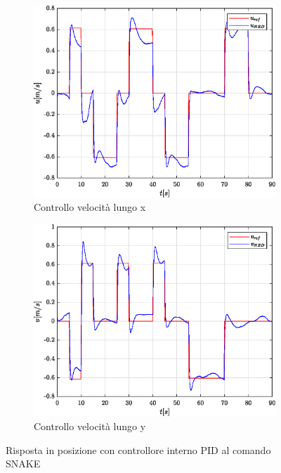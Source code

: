 \begin{figure}
\begin{subfigure}{0.45\textwidth}
	\end{subfigure}
	\\
	\begin{subfigure}{0.45\textwidth}
		\centering
		\includegraphics[width=1\textwidth]{Simulazioni/Figure/PID/SNAKE/PositionControlXVel}
		\caption{Controllo velocità lungo x}
		\label{fig:SNAKEerrvelxPID}
	\end{subfigure}
	\hfill
	\begin{subfigure}{0.45\textwidth}
		\centering
		\includegraphics[width=1\textwidth]{Simulazioni/Figure/PID/SNAKE/PositionControlYVel}
		\caption{Controllo velocità lungo y}
		\label{fig:SNAKEerrvelyPID}
	\end{subfigure}
	\caption{Risposta in posizione con controllore interno PID al comando SNAKE}
\end{figure}

